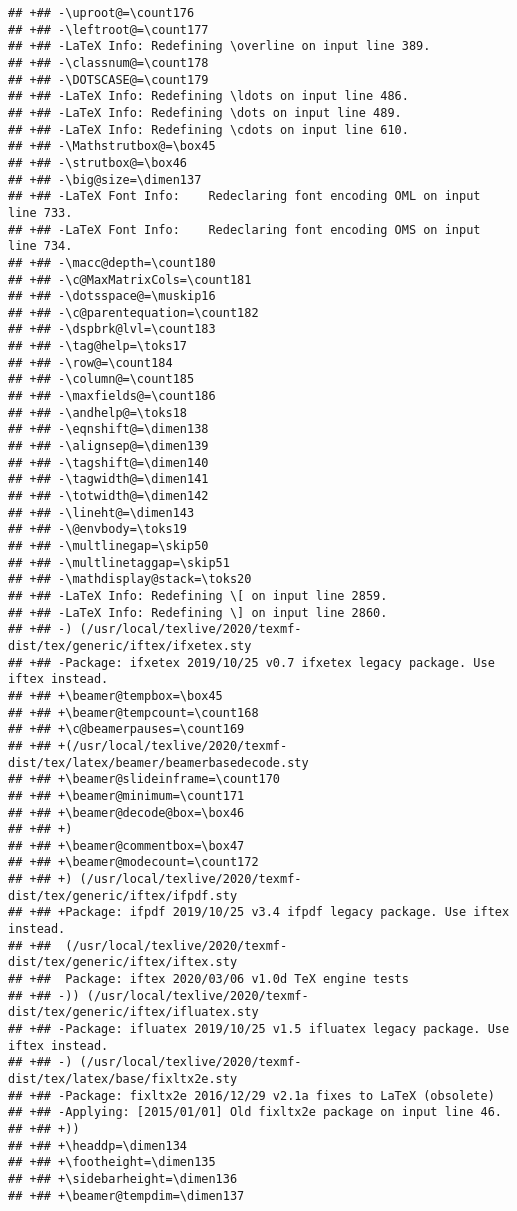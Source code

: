\documentclass[ignorenonframetext,]{beamer}
\begin{document}
\begin{verbatim}
## +## -\uproot@=\count176
## +## -\leftroot@=\count177
## +## -LaTeX Info: Redefining \overline on input line 389.
## +## -\classnum@=\count178
## +## -\DOTSCASE@=\count179
## +## -LaTeX Info: Redefining \ldots on input line 486.
## +## -LaTeX Info: Redefining \dots on input line 489.
## +## -LaTeX Info: Redefining \cdots on input line 610.
## +## -\Mathstrutbox@=\box45
## +## -\strutbox@=\box46
## +## -\big@size=\dimen137
## +## -LaTeX Font Info:    Redeclaring font encoding OML on input line 733.
## +## -LaTeX Font Info:    Redeclaring font encoding OMS on input line 734.
## +## -\macc@depth=\count180
## +## -\c@MaxMatrixCols=\count181
## +## -\dotsspace@=\muskip16
## +## -\c@parentequation=\count182
## +## -\dspbrk@lvl=\count183
## +## -\tag@help=\toks17
## +## -\row@=\count184
## +## -\column@=\count185
## +## -\maxfields@=\count186
## +## -\andhelp@=\toks18
## +## -\eqnshift@=\dimen138
## +## -\alignsep@=\dimen139
## +## -\tagshift@=\dimen140
## +## -\tagwidth@=\dimen141
## +## -\totwidth@=\dimen142
## +## -\lineht@=\dimen143
## +## -\@envbody=\toks19
## +## -\multlinegap=\skip50
## +## -\multlinetaggap=\skip51
## +## -\mathdisplay@stack=\toks20
## +## -LaTeX Info: Redefining \[ on input line 2859.
## +## -LaTeX Info: Redefining \] on input line 2860.
## +## -) (/usr/local/texlive/2020/texmf-dist/tex/generic/iftex/ifxetex.sty
## +## -Package: ifxetex 2019/10/25 v0.7 ifxetex legacy package. Use iftex instead.
## +## +\beamer@tempbox=\box45
## +## +\beamer@tempcount=\count168
## +## +\c@beamerpauses=\count169
## +## +(/usr/local/texlive/2020/texmf-dist/tex/latex/beamer/beamerbasedecode.sty
## +## +\beamer@slideinframe=\count170
## +## +\beamer@minimum=\count171
## +## +\beamer@decode@box=\box46
## +## +)
## +## +\beamer@commentbox=\box47
## +## +\beamer@modecount=\count172
## +## +) (/usr/local/texlive/2020/texmf-dist/tex/generic/iftex/ifpdf.sty
## +## +Package: ifpdf 2019/10/25 v3.4 ifpdf legacy package. Use iftex instead.
## +##  (/usr/local/texlive/2020/texmf-dist/tex/generic/iftex/iftex.sty
## +##  Package: iftex 2020/03/06 v1.0d TeX engine tests
## +## -)) (/usr/local/texlive/2020/texmf-dist/tex/generic/iftex/ifluatex.sty
## +## -Package: ifluatex 2019/10/25 v1.5 ifluatex legacy package. Use iftex instead.
## +## -) (/usr/local/texlive/2020/texmf-dist/tex/latex/base/fixltx2e.sty
## +## -Package: fixltx2e 2016/12/29 v2.1a fixes to LaTeX (obsolete)
## +## -Applying: [2015/01/01] Old fixltx2e package on input line 46.
## +## +))
## +## +\headdp=\dimen134
## +## +\footheight=\dimen135
## +## +\sidebarheight=\dimen136
## +## +\beamer@tempdim=\dimen137

\end{verbatim}
\end{document}
